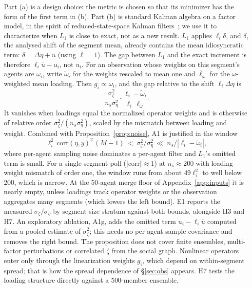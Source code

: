 \documentclass[10pt]{article}
\theoremstyle{remark}
\begin{document}
Part (a) is a design choice: the metric is chosen so that its minimizer has the form of the first term in (b). Part (b) is standard Kalman algebra on a factor model, in the spirit of reduced-state-space Kalman filters~\cite{cane1996}; we use it to characterize when $L_1$ is close to exact, not as a new result. $L_1$ applies $\ell_i\delta$, and $\delta$, the analysed shift of the segment mean, already contains the mean idiosyncratic term: $\delta=\Delta\eta+\bar u$ (using $\bar\ell=1$). The gap between $L_1$ and the exact increment is therefore $\ell_i\bar u-u_i$, not $u_i$. For an observation whose weights on this segment's agents are $\omega_i$, write $\tilde\omega_i$ for the weights rescaled to mean one and $\bar\ell_\omega$ for the $\omega$-weighted mean loading. Then $g_i\propto\omega_i$, and the gap relative to the shift $\ell_i\Delta\eta$ is
\[
\frac{\sigma_\zeta^2}{n_s\sigma_\eta^2}\cdot\frac{\ell_i-\tilde\omega_i}{\ell_i\,\bar\ell_\omega}.
\]
It vanishes when loadings equal the normalized operator weights and is otherwise of relative order $\sigma_\zeta^2/(n_s\sigma_\eta^2)$, scaled by the mismatch between loading and weight. Combined with Proposition~\ref{prop:noise}, A1 is justified in the window
\[
\ell_i^2\,\mathrm{corr}(\eta,y)^2\,(M-1)\ <\ \sigma_\zeta^2/\sigma_\eta^2\ \ll\ n_s/|\ell_i-\tilde\omega_i| ,
\]
where per-agent sampling noise dominates a per-agent filter and $L_1$'s omitted term is small. For a single-segment poll ($|\mathrm{corr}|\approx1$) at $n_s\approx200$ with loading--weight mismatch of order one, the window runs from about $49\ell_i^2$ to well below 200, which is narrow. At the 50-agent merge floor of Appendix~\ref{app:inputs} it is nearly empty, unless loadings track operator weights or the observation aggregates many segments (which lowers the left bound). E1 reports the measured $\sigma_\zeta/\sigma_\eta$ by segment-size stratum against both bounds, alongside H3 and H7. An exploratory ablation, A1g, adds the omitted term $u_i-\ell_i\bar u$ computed from a pooled estimate of $\sigma_\zeta^2$; this needs no per-agent sample covariance and removes the right bound. The proposition does not cover finite ensembles, multi-factor perturbations or correlated $\zeta$ from the social graph. Nonlinear operators enter only through the linearization weights $g_i$, which depend on within-segment spread; that is how the spread dependence of \S\ref{sec:obs} appears. H7 tests the loading structure directly against a 500-member ensemble.
\end{document}
